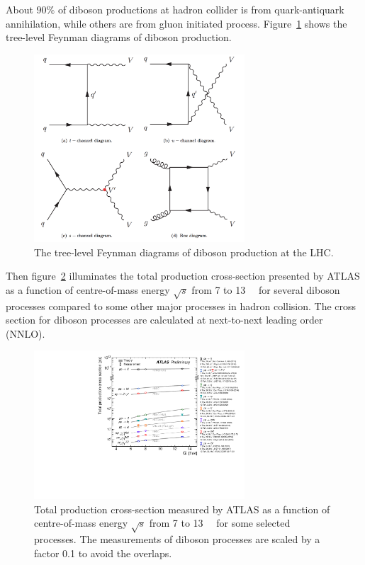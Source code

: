 About $90\%$ of diboson productions at hadron collider is from quark-antiquark annihilation,
while others are from gluon initiated process.
Figure~\ref{fig:diboson_fd1} shows the tree-level Feynman diagrams of diboson production.
\begin{figure}[!htb]
  \centering
  \includegraphics[width=0.7\textwidth]{figures/Theory/diboson_prod_fey.png}
  \caption{The tree-level Feynman diagrams of diboson production at the LHC.}
  \label{fig:diboson_fd1}
\end{figure}
Then figure~\ref{fig:diboson_xs1} illuminates the total production cross-section presented by ATLAS
as a function of centre-of-mass energy $\sqrt{s}$ from 7 to 13~\tev~ for several diboson processes compared 
to some other major processes in hadron collision.
The cross section for diboson processes are calculated at next-to-next leading order (NNLO). 
\begin{figure}[!htb]
  \centering
  \includegraphics[width=0.7\textwidth]{figures/Theory/ATLAS_n_SMSummary_SqrtS.pdf}
  \caption{Total production cross-section measured by ATLAS as a function of centre-of-mass energy $\sqrt{s}$ from 7 to 13~\tev~ for some selected processes.
	   The measurements of diboson processes are scaled by a factor 0.1 to avoid the overlaps.}
  \label{fig:diboson_xs1}
\end{figure}

